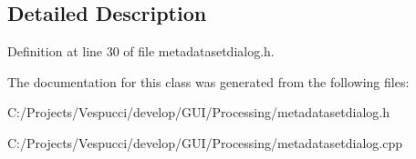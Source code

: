 \subsection{Detailed Description}


Definition at line 30 of file metadatasetdialog.\+h.



The documentation for this class was generated from the following files\+:\begin{DoxyCompactItemize}
\item 
C\+:/\+Projects/\+Vespucci/develop/\+G\+U\+I/\+Processing/metadatasetdialog.\+h\item 
C\+:/\+Projects/\+Vespucci/develop/\+G\+U\+I/\+Processing/metadatasetdialog.\+cpp\end{DoxyCompactItemize}
